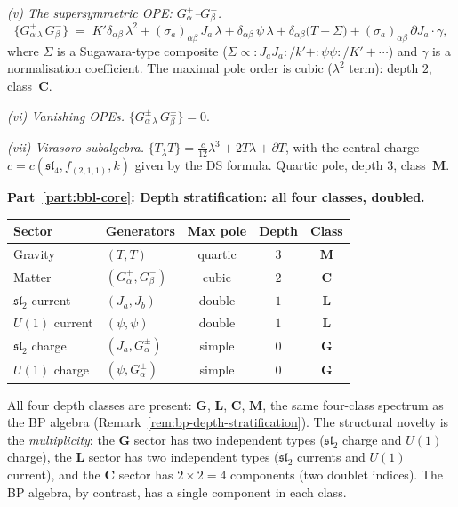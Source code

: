 \begin{computation}
\smallskip
\noindent\emph{(v) The supersymmetric OPE:
$G^+_\alpha$--$G^-_\beta$.}
\begin{equation}\label{eq:sl4hook-GpGm}
\{G^+_\alpha{}_\lambda\, G^-_\beta\}
\;=\;
K'\delta_{\alpha\beta}\,\lambda^2
+ (\sigma_a)_{\alpha\beta}\, J_a\,\lambda
+ \delta_{\alpha\beta}\,\psi\,\lambda
+ \delta_{\alpha\beta}\bigl(T + \Sigma\bigr)
+ (\sigma_a)_{\alpha\beta}\,\partial J_a\cdot\gamma,
\end{equation}
where $\Sigma$ is a Sugawara-type composite
($\Sigma \propto {:}J_a J_a{:}/k' + {:}\psi\psi{:}/K' + \cdots$)
and $\gamma$ is a normalisation coefficient. The
maximal pole order is cubic ($\lambda^2$ term): depth $2$,
class~$\mathbf{C}$.

\smallskip
\noindent\emph{(vi) Vanishing OPEs.}
$\{G^\pm_\alpha{}_\lambda\, G^\pm_\beta\} = 0$.

\smallskip
\noindent\emph{(vii) Virasoro subalgebra.}
$\{T_\lambda T\} = \frac{c}{12}\lambda^3 + 2T\lambda
+ \partial T$,
with the central charge
$c = c(\mathfrak{sl}_4, f_{(2,1,1)}, k)$ given by the
DS formula. Quartic pole, depth $3$,
class~$\mathbf{M}$.

\medskip
\noindent\textbf{Part~\ref{part:bbl-core}: Depth stratification:
all four classes, doubled.}

\begin{center}
\renewcommand{\arraystretch}{1.15}
\begin{tabular}{llccc}
\textbf{Sector} & \textbf{Generators}
 & \textbf{Max pole} & \textbf{Depth}
 & \textbf{Class} \\
\hline
Gravity & $(T,T)$ & quartic & $3$ & $\mathbf{M}$ \\
Matter & $(G^+_\alpha, G^-_\beta)$ & cubic & $2$
 & $\mathbf{C}$ \\
$\mathfrak{sl}_2$ current & $(J_a, J_b)$ & double & $1$
 & $\mathbf{L}$ \\
$U(1)$ current & $(\psi, \psi)$ & double & $1$
 & $\mathbf{L}$ \\
$\mathfrak{sl}_2$ charge & $(J_a, G^\pm_\alpha)$
 & simple & $0$ & $\mathbf{G}$ \\
$U(1)$ charge & $(\psi, G^\pm_\alpha)$
 & simple & $0$ & $\mathbf{G}$
\end{tabular}
\end{center}

All four depth classes are present:
$\mathbf{G}$, $\mathbf{L}$, $\mathbf{C}$, $\mathbf{M}$,
the same four-class spectrum as the BP algebra
(Remark~\ref{rem:bp-depth-stratification}). The
structural novelty is the \emph{multiplicity}: the
$\mathbf{G}$ sector has two independent types
($\mathfrak{sl}_2$ charge and $U(1)$ charge), the
$\mathbf{L}$ sector has two independent types
($\mathfrak{sl}_2$ currents and $U(1)$ current), and the
$\mathbf{C}$ sector has $2 \times 2 = 4$ components
(two doublet indices). The BP algebra, by contrast,
has a single component in each class.


\end{computation}

